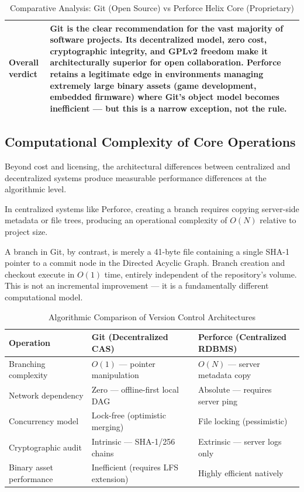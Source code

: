 \begin{table}[h!]
\begin{tabular}{@{}p{3.2cm} p{5.5cm} p{5.5cm}@{}}
\textbf{Overall verdict} &
\multicolumn{2}{p{11cm}}{Git is the clear recommendation for the vast majority of software projects. Its
decentralized model, zero cost, cryptographic integrity, and GPLv2 freedom make it
architecturally superior for open collaboration. Perforce retains a legitimate edge in
environments managing extremely large binary assets (game development, embedded firmware)
where Git's object model becomes inefficient — but this is a narrow exception, not the rule.} \\

\bottomrule
\end{tabular}
\caption{Comparative Analysis: Git (Open Source) vs Perforce Helix Core (Proprietary)}
\end{table}

\subsection{Computational Complexity of Core Operations}

Beyond cost and licensing, the architectural differences between centralized and
decentralized systems produce measurable performance differences at the algorithmic level.

In centralized systems like Perforce, creating a branch requires copying server-side
metadata or file trees, producing an operational complexity of $O(N)$ relative to project
size.

A branch in Git, by contrast, is merely a 41-byte file containing a single SHA-1 pointer
to a commit node in the Directed Acyclic Graph. Branch creation and checkout execute in
$O(1)$ time, entirely independent of the repository's volume. This is not an incremental
improvement — it is a fundamentally different computational model.

\begin{table}[h!]
\centering
\small
\begin{tabular}{@{}lll@{}}
\toprule
\textbf{Operation} & \textbf{Git (Decentralized CAS)} & \textbf{Perforce (Centralized RDBMS)} \\
\midrule
Branching complexity     & $O(1)$ — pointer manipulation      & $O(N)$ — server metadata copy \\
Network dependency       & Zero — offline-first local DAG      & Absolute — requires server ping \\
Concurrency model        & Lock-free (optimistic merging)      & File locking (pessimistic) \\
Cryptographic audit      & Intrinsic — SHA-1/256 chains        & Extrinsic — server logs only \\
Binary asset performance & Inefficient (requires LFS extension) & Highly efficient natively \\
\bottomrule
\end{tabular}
\caption{Algorithmic Comparison of Version Control Architectures}
\end{table}

